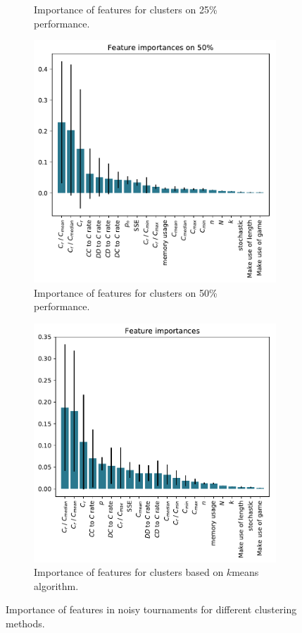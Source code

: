 \documentclass{article}
\begin{document}
\begin{figure}[!htbp]
\begin{subfigure}{0.5\textwidth}
\begin{center}
        \end{center}
        \caption{Importance of features for clusters on 25\% performance.}
    \end{subfigure}
    \begin{subfigure}{0.5\textwidth}
        \begin{center}
            \includegraphics[width=.75\linewidth]{../new_output/noise/_feature_importance_bar_plot_cluster_on_0_5.pdf}
        \end{center}
        \caption{Importance of features for clusters on 50\% performance.}
    \end{subfigure}\hfill
    \begin{subfigure}{0.5\textwidth}
        \begin{center}
            \includegraphics[width=.75\linewidth]{../k_means_output/noise/_feature_importance_bar_plot.pdf}
        \end{center}
        \caption{Importance of features for clusters based on \(k\)means algorithm.}
    \end{subfigure}
    \caption{Importance of features in noisy tournaments for different
    clustering methods.}\label{fig:clustering_importance_noise}
\end{figure}
\end{document}
